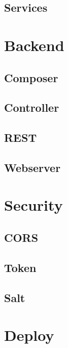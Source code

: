 \subsection{Services}





\section{Backend}

\subsection{Composer}

\subsection{Controller}

\subsection{REST}

\subsection{Webserver}


\section{Security}

\subsection{CORS}

\subsection{Token}

\subsection{Salt}


\section{Deploy}
